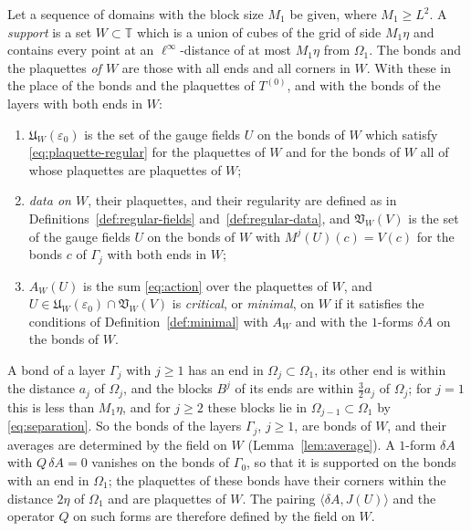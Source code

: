 \documentclass[11pt]{preprint}
\numberwithin{equation}{section}
\begin{document}
\begin{definition}[Supports]\label{def:support}
Let a sequence of domains with the block size $M_1$ be given, where $M_1 \geqslant L^2$. A \emph{support} is a set $W \subset \mathbb T$ which is a union of cubes of the grid of side $M_1\eta$ and contains every point at an $\ell^\infty$-distance of at most $M_1\eta$ from $\Omega_1$. The bonds and the plaquettes \emph{of $W$} are those with all ends and all corners in $W$. With these in the place of the bonds and the plaquettes of $T^{(0)}$, and with the bonds of the layers with both ends in $W$:
\begin{enumerate}[label=(\roman*)]
\item $\mathfrak U_W(\varepsilon_0)$ is the set of the gauge fields $U$ on the bonds of $W$ which satisfy \eqref{eq:plaquette-regular} for the plaquettes of $W$ and for the bonds of $W$ all of whose plaquettes are plaquettes of $W$;
\item \emph{data on $W$}, their plaquettes, and their regularity are defined as in Definitions~\ref{def:regular-fields} and~\ref{def:regular-data}, and $\mathfrak V_W(V)$ is the set of the gauge fields $U$ on the bonds of $W$ with $M^j(U)(c) = V(c)$ for the bonds $c$ of $\Gamma_j$ with both ends in $W$;
\item $A_W(U)$ is the sum \eqref{eq:action} over the plaquettes of $W$, and $U \in \mathfrak U_W(\varepsilon_0) \cap \mathfrak V_W(V)$ is \emph{critical}, or \emph{minimal}, on $W$ if it satisfies the conditions of Definition~\ref{def:minimal} with $A_W$ and with the $1$-forms $\delta A$ on the bonds of $W$.
\end{enumerate}
\end{definition}

A bond of a layer $\Gamma_j$ with $j \geqslant 1$ has an end in $\Omega_j \subset \Omega_1$, its other end is within the distance $a_j$ of $\Omega_j$, and the blocks $B^j$ of its ends are within $\frac{3}{2}a_j$ of $\Omega_j$; for $j = 1$ this is less than $M_1\eta$, and for $j \geqslant 2$ these blocks lie in $\Omega_{j-1} \subset \Omega_1$ by \eqref{eq:separation}. So the bonds of the layers $\Gamma_j$, $j \geqslant 1$, are bonds of $W$, and their averages are determined by the field on $W$ (Lemma~\ref{lem:average}). A $1$-form $\delta A$ with $Q\,\delta A = 0$ vanishes on the bonds of $\Gamma_0$, so that it is supported on the bonds with an end in $\Omega_1$; the plaquettes of these bonds have their corners within the distance $2\eta$ of $\Omega_1$ and are plaquettes of $W$. The pairing $\langle\delta A, J(U)\rangle$ and the operator $Q$ on such forms are therefore defined by the field on $W$.
\end{document}
